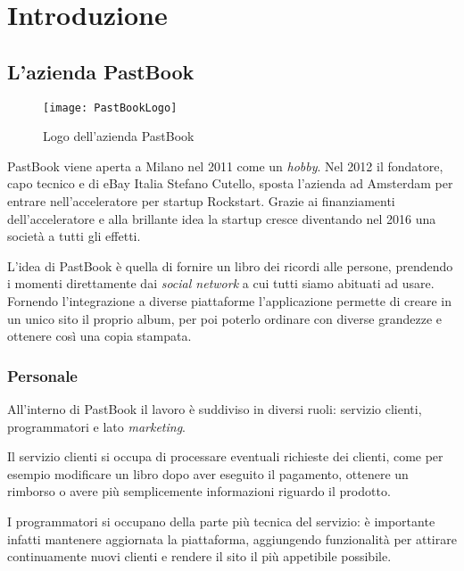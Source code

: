 \mainmatter

\chapter{Introduzione}

\section{L'azienda PastBook}

\begin{figure}[H]
  \centering
  \texttt{[image: PastBookLogo]}
  \caption{Logo dell'azienda PastBook}
\end{figure}

PastBook viene aperta a Milano nel 2011 come un \textit{hobby}. Nel 2012 il
fondatore, capo tecnico e  di eBay Italia
Stefano Cutello, sposta l'azienda ad Amsterdam per entrare nell'acceleratore
per \gls{startup} Rockstart. Grazie ai finanziamenti dell'acceleratore e alla
brillante idea la \gls{startup} cresce diventando nel 2016 una società a tutti
gli effetti.

L'idea di PastBook è quella di fornire un libro dei ricordi alle
persone, prendendo i momenti direttamente dai \textit{social network} a cui
tutti siamo abituati ad usare. Fornendo l'integrazione a diverse piattaforme
l'applicazione permette di creare in un unico sito il proprio album, per poi
poterlo ordinare con diverse grandezze e ottenere così una copia stampata.

\subsection{Personale}

All'interno di PastBook il lavoro è suddiviso in diversi ruoli: servizio
clienti, programmatori e lato \textit{marketing}.

Il servizio clienti si occupa di processare eventuali richieste dei clienti,
come per esempio modificare un libro dopo aver eseguito il pagamento, ottenere
un rimborso o avere più semplicemente informazioni riguardo il prodotto.

I programmatori si occupano della parte più tecnica del servizio: è importante
infatti mantenere aggiornata la piattaforma, aggiungendo funzionalità
per attirare continuamente nuovi clienti e rendere il sito il più appetibile
possibile.

